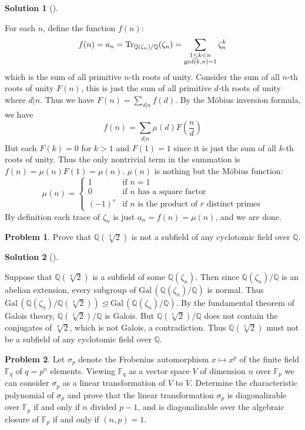\documentclass{article}
\theoremstyle{definition}
\newtheorem{prob}{Problem}
\newtheorem*{sol}{Solution}
\newenvironment{sols}[1][]{%
  \begin{sol}[#1]$ $\par\nobreak\ignorespaces
}{%
  \end{sol}
}
\newcommand{\FF}{\mathbb F}
\newcommand{\QQ}{\mathbb Q}
\newcommand{\Gal}{\text{Gal}\,}
\begin{document}
\begin{sols}
	For each $n$, define the function $f(n)$:  
	\[
		f(n) = a_n = \Tr_{\QQ(\zeta_n)/\QQ}(\zeta_n) = \sum_{\substack{1 \leq k < n \\ \gcd (k, n) = 1}}\zeta_n^k
	\]
	which is the sum of all primitive $n$-th roots of unity.
	Consider the sum of all $n$-th roots of unity $F(n)$, this is just the sum of all primitive $d$-th roots of unity where $d|n$.
	Thus we have $F(n) = \sum_{d | n} f(d)$.
	By the M\"obius inversion formula, we have 
	\[
		f(n) = \sum_{d|n} \mu(d) F\left(\frac{n}{d}\right)
	\]
	But each $F(k) = 0$ for $k > 1$ and $F(1) = 1$ since it is just the sum of all $k$-th roots of unity.
	Thus the only nontrivial term in the summation is $f(n) = \mu(n) F(1) = \mu(n)$.
	$\mu(n)$ is nothing but the M\"obius function:
	\[
		\mu(n) = 
		\begin{cases}
			1 & \text{if } n = 1\\
			0 & \text{if } n \text{ has a square factor}\\
			(-1)^r & \text{if } n \text{ is the product of } r \text{ distinct primes}
		\end{cases}
	\]
	By definition each trace of $\zeta_n$ is just $a_n = f(n) = \mu(n)$, and we are done.
\end{sols}

\setcounter{prob}{9}
\begin{prob}
	Prove that $\QQ(\sqrt[3]{2})$ is not a subfield of any cyclotomic field over $\QQ$.
\end{prob}

\begin{sols}
	Suppose that $\QQ(\sqrt[3]{2})$ is a subfield of some $\QQ(\zeta_n)$.
	Then since $\QQ(\zeta_n)/\QQ$ is an abelian extension, every subgroup of $\Gal(\QQ(\zeta_n)/\QQ)$ is normal.
	Thus $\Gal(\QQ(\zeta_n)/\QQ(\sqrt[3]{2})) \trianglelefteq \Gal(\QQ(\zeta_n)/\QQ)$.
	By the fundamental theorem of Galois theory, $\QQ(\sqrt[3]{2})/\QQ$ is Galois.
	But $\QQ(\sqrt[3]{2})/\QQ$ does not contain the conjugates of $\sqrt[3]{2}$, which is not Galois, a contradiction.
	Thus $\QQ(\sqrt[3]{2})$ must not be a subfield of any cyclotomic field over $\QQ$.
\end{sols}

\setcounter{prob}{11}
\begin{prob}
	Let $\sigma_p$ denote the Frobenius automorphism $x \mapsto x^p$ of the finite field $\FF_q$ of $q = p^n$ elements.
	Viewing $\FF_q$ as a vector space $V$ of dimension $n$ over $\FF_p$ we can consider $\sigma_p$ as a linear transformation of $V$ to $V$.
	Determine the characteristic polynomial of $\sigma_p$ and prove that the linear transformation $\sigma_p$ is diagonalizable over $\FF_p$ if and only if $n$ divided $p - 1$, and is diagonalizable over the algebraic closure of $\FF_p$ if and only if $(n, p) = 1$.
\end{prob}
\end{document}
